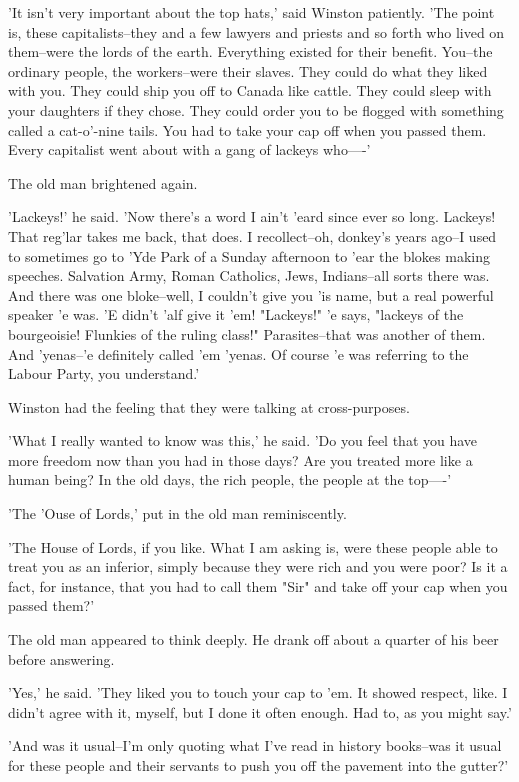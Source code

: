 \documentclass{article}
\begin{document}
'It isn't very important about the top hats,' said Winston patiently.
'The point is, these capitalists--they and a few lawyers and priests and
so forth who lived on them--were the lords of the earth. Everything existed
for their benefit. You--the ordinary people, the workers--were their
slaves. They could do what they liked with you. They could ship you off to
Canada like cattle. They could sleep with your daughters if they chose.
They could order you to be flogged with something called a cat-o'-nine
tails. You had to take your cap off when you passed them. Every capitalist
went about with a gang of lackeys who----'

The old man brightened again.

'Lackeys!' he said. 'Now there's a word I ain't 'eard since ever so long.
Lackeys! That reg'lar takes me back, that does. I recollect--oh, donkey's
years ago--I used to sometimes go to 'Yde Park of a Sunday afternoon to
'ear the blokes making speeches. Salvation Army, Roman Catholics, Jews,
Indians--all sorts there was. And there was one bloke--well, I couldn't
give you 'is name, but a real powerful speaker 'e was. 'E didn't 'alf
give it 'em! "Lackeys!" 'e says, "lackeys of the bourgeoisie! Flunkies of
the ruling class!" Parasites--that was another of them. And 'yenas--'e
definitely called 'em 'yenas. Of course 'e was referring to the Labour
Party, you understand.'

Winston had the feeling that they were talking at cross-purposes.

'What I really wanted to know was this,' he said. 'Do you feel that you
have more freedom now than you had in those days? Are you treated more
like a human being? In the old days, the rich people, the people at the
top----'

'The 'Ouse of Lords,' put in the old man reminiscently.

'The House of Lords, if you like. What I am asking is, were these people
able to treat you as an inferior, simply because they were rich and you
were poor? Is it a fact, for instance, that you had to call them "Sir" and
take off your cap when you passed them?'

The old man appeared to think deeply. He drank off about a quarter of his
beer before answering.

'Yes,' he said. 'They liked you to touch your cap to 'em. It showed
respect, like. I didn't agree with it, myself, but I done it often enough.
Had to, as you might say.'

'And was it usual--I'm only quoting what I've read in history books--was
it usual for these people and their servants to push you off the pavement
into the gutter?'
\end{document}
